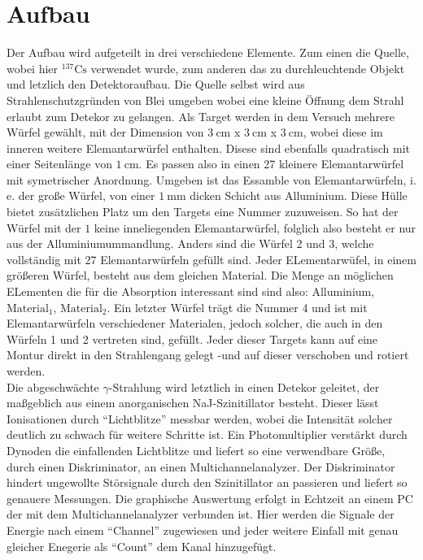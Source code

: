 \section{Aufbau}
Der Aufbau wird aufgeteilt in drei verschiedene Elemente. Zum einen die Quelle, wobei hier $^{137}\text{Cs}$ verwendet wurde, 
zum anderen das zu durchleuchtende Objekt und letzlich den Detektoraufbau. 
Die Quelle selbst wird aus Strahlenschutzgründen von Blei umgeben wobei eine kleine Öffnung dem Strahl erlaubt zum Detekor zu gelangen.
Als Target werden in dem Versuch mehrere Würfel gewählt, mit der Dimension von $\SI{3}{\centi\meter}$ x $\SI{3}{\centi\meter}$ x $\SI{3}{\centi\meter}$,
wobei diese im inneren weitere Elemantarwürfel enthalten. Disese sind ebenfalls quadratisch mit einer Seitenlänge von $\SI{1}{\centi\meter}$.
Es passen also in einen 27 kleinere Elemantarwürfel mit symetrischer Anordnung. Umgeben ist das Essamble von Elemantarwürfeln, i. e.
der große Würfel, von einer $\SI{1}{\milli\meter}$ dicken Schicht aus Alluminium. Diese Hülle bietet zusätzlichen Platz um 
den Targets eine Nummer zuzuweisen. So hat der Würfel mit der $1$ keine inneliegenden Elemantarwürfel, folglich also besteht er nur aus
der Alluminiumummandlung. Anders sind die Würfel 2 und 3, welche vollständig mit 27 Elemantarwürfeln gefüllt sind.
Jeder ELementarwüfel, in einem größeren Würfel, besteht aus dem gleichen Material. Die Menge an möglichen ELementen die für die Absorption 
interessant sind sind also: Alluminium, $\text{Material}_{1}$, $\text{Material}_{2}$.
Ein letzter Würfel trägt die Nummer 4 und ist mit Elemantarwürfeln verschiedener Materialen, jedoch solcher, die auch in den Würfeln 1 und 2 vertreten sind, gefüllt.
Jeder dieser Targets kann auf eine Montur direkt in den Strahlengang gelegt -und auf dieser verschoben und rotiert werden.
\\
\newline
Die abgeschwächte $\gamma$-Strahlung wird letztlich in einen Detekor geleitet, der maßgeblich aus einem anorganischen NaJ-Szinitillator besteht.
Dieser lässt Ionisationen durch \enquote{Lichtblitze} messbar werden, wobei die Intensität solcher deutlich zu schwach für weitere Schritte ist.
Ein Photomultiplier verstärkt durch Dynoden die einfallenden Lichtblitze und liefert so eine verwendbare Größe, durch einen Diskriminator, 
an einen Multichannelanalyzer. Der Diskriminator hindert ungewollte Störsignale durch den Szinitillator an passieren und liefert so genauere Messungen.
Die graphische Auswertung erfolgt in Echtzeit an einem PC der mit dem Multichannelanalyzer verbunden ist. Hier werden die Signale 
der Energie nach einem \enquote{Channel} zugewiesen und jeder weitere Einfall mit genau gleicher Enegerie als \enquote{Count} dem Kanal hinzugefügt.


